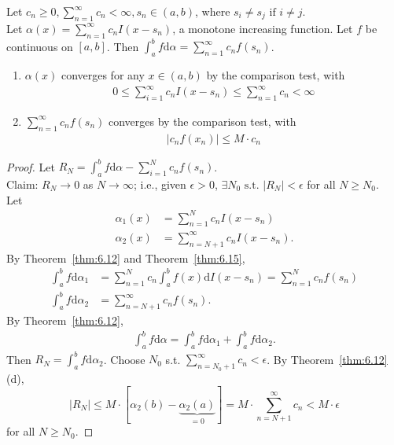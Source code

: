 \begin{thm}[16]
	Let $c_{n}\ge 0, \sum_{n=1}^{\infty}{c_{n}}<\infty, s_{n} \in (a,b)$, where $s_i\neq s_j \text{ if } i\neq j$.\\
	Let $\alpha(x)=\sum_{n=1}^{\infty}{c_{n} I(x-s_{n})}$, a monotone increasing function.
	Let $f$ be continuous on $[a,b]$.
	Then $\int_{a}^{b}{f\mathrm{d}\alpha}=\sum_{n=1}^{\infty}{c_{n} f(s_{n})}$.
	\begin{note}
		\hfill
		\begin{enumerate}
			\item $\alpha(x)$ converges for any $x \in (a,b)$ by the comparison test, with
			      \begin{align*}
				      0\le \sum_{i=1}^{\infty}{c_{n} I(x-s_{n})}\le \sum_{n=1}^{\infty}{c_{n}}<\infty
			      \end{align*}
			\item $\sum_{n=1}^{\infty}{c_{n} f(s_{n})}$ converges by the comparison test, with
			      \begin{align*}
				      |c_{n} f(x_n)|\le M \cdot c_{n}
			      \end{align*}
		\end{enumerate}
	\end{note}

	\begin{proof}
		Let $R_N=\int_{a}^{b}{f\mathrm{d}\alpha}-\sum_{i=1}^{N}{c_{n}f(s_{n})}$.\\
		Claim: $R_N \to 0$ as $N \to \infty$; i.e., given $\epsilon>0$, $\exists{N_0} \text{ s.t. } |R_N|<\epsilon$ for all $N \ge N_0$.\\
		Let
		\begin{align*}
			\alpha_1(x) & =\sum_{n=1}^{N}{c_{n} I(x-s_{n})}         \\
			\alpha_2(x) & =\sum_{n=N+1}^{\infty}{c_{n} I(x-s_{n})}.
		\end{align*}
		By Theorem~\ref{thm:6.12} and Theorem~\ref{thm:6.15},
		\begin{align*}
			\int_{a}^{b}{f\mathrm{d}\alpha_1} & =\sum_{n=1}^{N}{c_{n} \int_{a}^{b}{f(x)\mathrm{d}I(x-s_{n})}}=\sum_{n=1}^{N}{c_{n} f(s_{n})} \\
			\int_{a}^{b}{f\mathrm{d}\alpha_2} & =\sum_{n=N+1}^{\infty}{c_{n} f(s_{n})}.
		\end{align*}
		By Theorem~\ref{thm:6.12},
		\begin{align*}
			\int_{a}^{b}{f\mathrm{d}\alpha}=\int_{a}^{b}{f\mathrm{d}\alpha_1}+\int_{a}^{b}{f\mathrm{d}\alpha_2}.
		\end{align*}
		Then $R_N=\int_{a}^{b}{f\mathrm{d}\alpha_2}$. Choose $N_0$ s.t. $\sum_{n=N_0+1}^{\infty}{c_{n}}<\epsilon$. By Theorem~\ref{thm:6.12}(d),
		\[
			|R_N|\le M\cdot [\alpha_2(b)-\underbrace{\alpha_2(a)}_{=0}]=M\cdot\sum_{n=N+1}^{\infty}{c_{n}}<M \cdot \epsilon
		\]
		for all $N \ge N_0$.
	\end{proof}
\end{thm}


